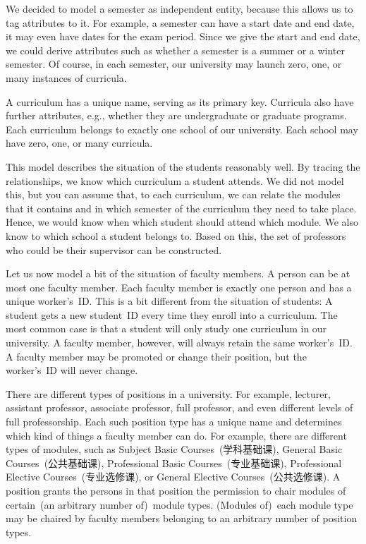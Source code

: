 We decided to model a semester as independent entity, because this allows us to tag attributes to it.
For example, a semester can have a start date and end date, it may even have dates for the exam period.
Since we give the start and end date, we could derive attributes such as whether a semester is a summer or a winter semester.
Of course, in each semester, our university may launch zero, one, or many instances of curricula.

A curriculum has a unique name, serving as its primary key.
Curricula also have further attributes, e.g., whether they are undergraduate or graduate programs.
Each curriculum belongs to exactly one school of our university.
Each school may have zero, one, or many curricula.

This model describes the situation of the students reasonably well.
By tracing the relationships, we know which curriculum a student attends.
We did not model this, but you can assume that, to each curriculum, we can relate the modules that it contains and in which semester of the curriculum they need to take place.
Hence, we would know when which student should attend which module.
We also know to which school a student belongs to.
Based on this, the set of professors who could be their supervisor can be constructed.

Let us now model a bit of the situation of faculty members.
A person can be at most one faculty member.
Each faculty member is exactly one person and has a unique worker's~ID.
This is a bit different from the situation of students:
A student gets a new student~ID every time they enroll into a curriculum.
The most common case is that a student will only study one curriculum in our university.
A faculty member, however, will always retain the same worker's~ID.
A faculty member may be promoted or change their position, but the worker's~ID will never change.

There are different types of positions in a university.
For example, lecturer, assistant professor, associate professor, full professor, and even different levels of full professorship.
Each such position type has a unique name and determines which kind of things a faculty member can do.
For example, there are different types of modules, such as %
Subject Basic Courses~(学科基础课), %
General Basic Courses~(公共基础课), %
Professional Basic Courses~(专业基础课), %
Professional Elective Courses~(专业选修课), or %
General Elective Courses~(公共选修课).
A position grants the persons in that position the permission to chair modules of certain~(an arbitrary number of)~module types.
(Modules of)~each module type may be chaired by faculty members belonging to an arbitrary number of position types.

